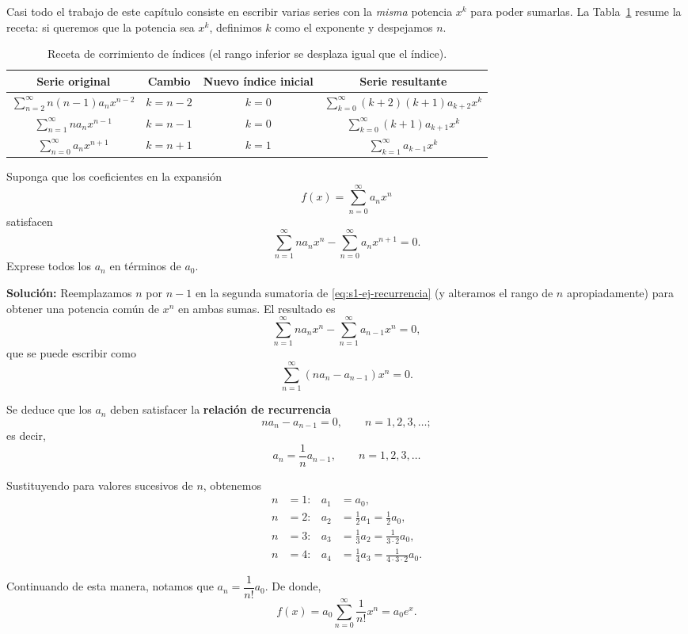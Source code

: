 Casi todo el trabajo de este capítulo consiste en escribir varias series con la \emph{misma} potencia $x^k$ para poder sumarlas. La Tabla~\ref{tab:s1-corrimiento} resume la receta: si queremos que la potencia sea $x^k$, definimos $k$ como el exponente y despejamos $n$.
 
\begin{table}[H]
\centering
\small
\caption{Receta de corrimiento de índices (el rango inferior se desplaza igual que el índice).}
\label{tab:s1-corrimiento}
\begin{tabular}{|c|c|c|c|}
\hline
\rowcolor{bbe!15}\textbf{Serie original} & \textbf{Cambio} & \textbf{Nuevo índice inicial} & \textbf{Serie resultante} \\ \hline
$\displaystyle\sum_{n=2}^{\infty} n(n-1)a_n x^{n-2}$ & $k=n-2$ & $k=0$ & $\displaystyle\sum_{k=0}^{\infty}(k+2)(k+1)a_{k+2}x^{k}$ \\ \hline
$\displaystyle\sum_{n=1}^{\infty} n a_n x^{n-1}$ & $k=n-1$ & $k=0$ & $\displaystyle\sum_{k=0}^{\infty}(k+1)a_{k+1}x^{k}$ \\ \hline
$\displaystyle\sum_{n=0}^{\infty} a_n x^{n+1}$ & $k=n+1$ & $k=1$ & $\displaystyle\sum_{k=1}^{\infty}a_{k-1}x^{k}$ \\ \hline
\end{tabular}
\end{table}
 
\begin{example}
    Suponga que los coeficientes en la expansión
\[ f(x) = \sum_{n=0}^{\infty} a_n x^n \]
satisfacen
\begin{equation}
\sum_{n=1}^{\infty} n a_n x^n - \sum_{n=0}^{\infty} a_n x^{n+1} = 0.
\label{eq:s1-ej-recurrencia}
\end{equation}
Exprese todos los $a_n$ en términos de $a_0$.
 
\noindent \textbf{Solución:} \quad Reemplazamos $n$ por $n - 1$ en la segunda sumatoria de \eqref{eq:s1-ej-recurrencia} (y alteramos el rango de $n$ apropiadamente) para obtener una potencia común de $x^n$ en ambas sumas. El resultado es
\[ \sum_{n=1}^{\infty} n a_n x^n - \sum_{n=1}^{\infty} a_{n-1} x^n = 0, \]
que se puede escribir como
\[ \sum_{n=1}^{\infty} (n a_n - a_{n-1}) x^n = 0. \]
 
Se deduce que los $a_n$ deben satisfacer la \textbf{relación de recurrencia}
\[ n a_n - a_{n-1} = 0, \qquad n = 1, 2, 3, \dots; \]
es decir,
\[ a_n = \frac{1}{n} a_{n-1}, \qquad n = 1, 2, 3, \dots \]
 
Sustituyendo para valores sucesivos de $n$, obtenemos
\begin{align*}
n &= 1: & a_1 &= a_0, \\
n &= 2: & a_2 &= \frac{1}{2} a_1 = \frac{1}{2} a_0, \\
n &= 3: & a_3 &= \frac{1}{3} a_2 = \frac{1}{3 \cdot 2} a_0, \\
n &= 4: & a_4 &= \frac{1}{4} a_3 = \frac{1}{4 \cdot 3 \cdot 2} a_0.
\end{align*}
 
Continuando de esta manera, notamos que $a_n = \dfrac{1}{n!} a_0$. De donde,
\[ f(x) = a_0 \sum_{n=0}^{\infty} \frac{1}{n!} x^n = a_0 e^x. \tag*{$\square$} \]
\end{example}
 
